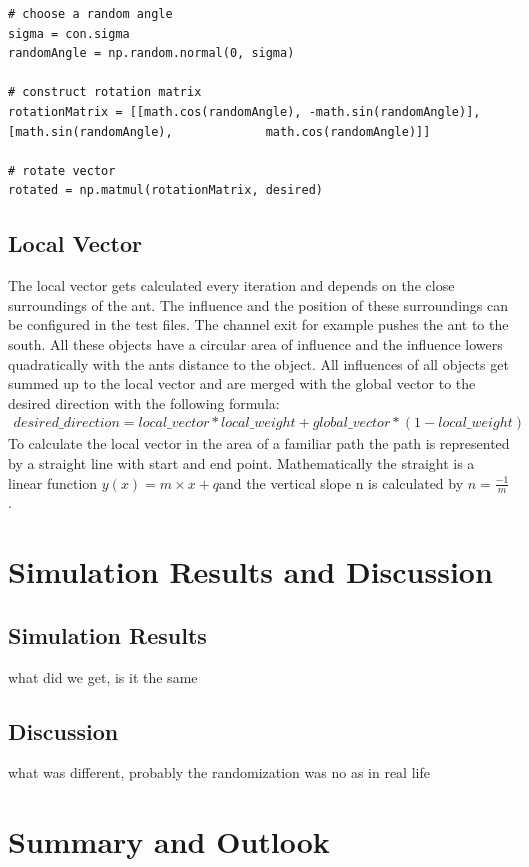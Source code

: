 \documentclass[11pt]{article}
\begin{document}
		
		
\begin{lstlisting}[caption={Randomization of desired step},label=lst:randomization]
# choose a random angle
sigma = con.sigma
randomAngle = np.random.normal(0, sigma)

# construct rotation matrix
rotationMatrix = [[math.cos(randomAngle), -math.sin(randomAngle)], [math.sin(randomAngle), 			   math.cos(randomAngle)]]

# rotate vector
rotated = np.matmul(rotationMatrix, desired)
\end{lstlisting}

	\subsection{Local Vector}
		The local vector gets calculated every iteration and depends on the close surroundings of the ant. The influence and the position of these surroundings can be configured in the test files. The channel exit for example pushes the ant to the south. All these objects have a circular area of influence and the influence lowers quadratically with the ants distance to the object. All influences of all objects get summed up to the local vector and are merged with the global vector to the desired direction with the following formula:
		\begin{align*}
			desired\_direction = local\_vector * local\_weight + global\_vector * (1-local\_weight)
		\end{align*}
To calculate the local vector in the area of a familiar path the path is represented by a straight line with start and end point. Mathematically the straight is a linear function \( y(x)= m\times x + q \)and the vertical slope n is calculated by \( n = \frac {-1} {m}\) . 
\section{Simulation Results and Discussion}
	\subsection{Simulation Results} %
		what did we get, is it the same
	\subsection{Discussion}
		what was different, probably the randomization was no as in real life
\section{Summary and Outlook} %
\end{document}

